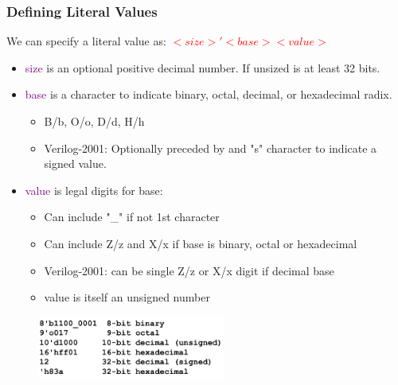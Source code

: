 \documentclass[t, notes, xcolor=table]{beamer}
\begin{document}
\begin{frame}
\frametitle{Defining Literal Values}

We can specify a literal value as: \textcolor{red}{$<size>'<base><value>$}
\begin{itemize}
\item \textcolor{purple}{size} is an optional positive decimal number. If unsized is at least 32 bits.
\item \textcolor{purple}{base} is a character to indicate binary, octal, decimal, or hexadecimal radix.
\begin{itemize}
	\item B/b, O/o, D/d, H/h
	\item Verilog-2001: Optionally preceded by and "s" character to indicate a signed value.
\end{itemize} 
\item \textcolor{purple}{value} is legal digits for base:
\begin{itemize}
	\item Can include "\_" if not 1st character
	\item Can include Z/z and X/x if base is binary, octal or hexadecimal
	\item Verilog-2001: can be single Z/z or X/x digit if decimal base
	\item value is itself an unsigned number
\end{itemize}
\end{itemize}

\begin{figure}[H!]
    \includegraphics[width=0.55\textwidth]{img/04_literal.png}
\end{figure}

\end{frame}
\end{document}
